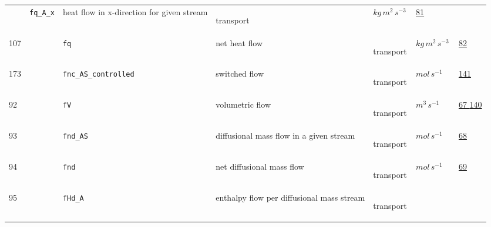 \begin{longtable}{|p{1cm}|p{2.5cm}|p{4.5cm}|p{8cm}|p{3.0cm}|p{3cm}|p{1cm}|}
             & \verb|fq_A_x|
             & heat flow in x-direction for given stream
             & \begin{lay}transport \end{lay}
             & $ kg \,m^{2} \,s^{-3} \, $
             &                 \hyperlink{"e:81"}{ 81 }
                 \\
        107
             & \hypertarget{"v:107"}{ $ {} $}
             & \verb|fq|
             & net heat flow
             & \begin{lay}transport \end{lay}
             & $ kg \,m^{2} \,s^{-3} \, $
             &                 \hyperlink{"e:82"}{ 82 }
                 \\
        173
             & \hypertarget{"v:173"}{ $ {} $}
             & \verb|fnc_AS_controlled|
             & switched flow
             & \begin{lay}transport \end{lay}
             & $ mol \,s^{-1} \, $
             &                 \hyperlink{"e:141"}{ 141 }
                 \\
        92
             & \hypertarget{"v:92"}{ $ {} $}
             & \verb|fV|
             & volumetric flow
             & \begin{lay}transport \end{lay}
             & $ m^{3} \,s^{-1} \, $
             &                 \hyperlink{"e:67"}{ 67 }
                                 \hyperlink{"e:140"}{ 140 }
                 \\
        93
             & \hypertarget{"v:93"}{ $ {} $}
             & \verb|fnd_AS|
             & diffusional mass flow in a given stream
             & \begin{lay}transport \end{lay}
             & $ mol \,s^{-1} \, $
             &                 \hyperlink{"e:68"}{ 68 }
                 \\
        94
             & \hypertarget{"v:94"}{ $ {} $}
             & \verb|fnd|
             & net diffusional mass flow
             & \begin{lay}transport \end{lay}
             & $ mol \,s^{-1} \, $
             &                 \hyperlink{"e:69"}{ 69 }
                 \\
        95
             & \hypertarget{"v:95"}{ $ {} $}
             & \verb|fHd_A|
             & enthalpy flow per diffusional mass stream
             & \begin{lay}transport \end{lay}

\end{longtable}
